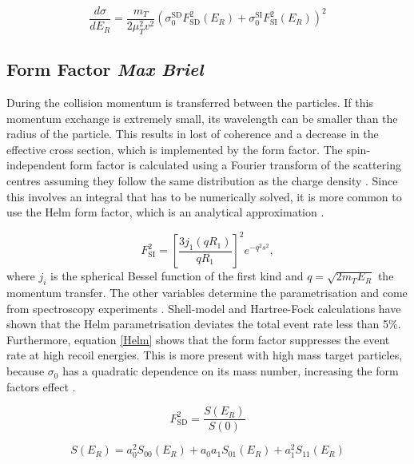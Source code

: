 \documentclass{article}
\begin{document}
\begin{equation} \label{Eff_cross}
    \frac{d\sigma}{dE_R} = \frac{m_T}{2\mu_T^2 v^2} \left( \sigma_0^\text{SD} F^2_\text{SD}(E_R) + \sigma_0^\text{SI} F^2_\text{SI}(E_R)\right)^2
\end{equation}

\subsection{Form Factor \small{\textit{Max Briel}}} 

During the collision momentum is transferred between the particles. If this momentum exchange is extremely small, its wavelength can be smaller than the radius of the particle. This results in lost of coherence and a decrease in the effective cross section, which is implemented by the form factor. 
The spin-independent form factor is calculated using a Fourier transform of the scattering centres assuming they follow the same distribution as the charge density \cite{Lewin:1995rx}. Since this involves an integral that has to be numerically solved, it is more common to use the Helm form factor, which is an analytical approximation \cite{Helm:1956zz}.

\begin{equation} \label{Helm}
    F^2_\text{SI} = \left[ \frac{3 j_1(qR_1)}{qR_1} \right]^2 e^{-q^2 s^2}, 
\end{equation}
where $j_i$ is the spherical Bessel function of the first kind and $q = \sqrt{2m_T E_R}$ the momentum transfer. The other variables determine the parametrisation and come from spectroscopy experiments \cite{Fricke:1995zz}. Shell-model \cite{Vietze:2014vsa} and Hartree-Fock calculations \cite{Co:2012adt, Duda:2006uk} have shown that the Helm parametrisation deviates the total event rate less than 5\%. Furthermore, equation \ref{Helm} shows that the form factor suppresses the event rate at high recoil energies. This is more present with high mass target particles, because $\sigma_0$ has a quadratic dependence on its mass number, increasing the form factors effect \cite{Undagoitia:2015gya}.

\begin{equation} \label{SD_Form}
    F^2_\text{SD} = \frac{S(E_R)}{S(0)}
\end{equation}

\begin{equation} \label{Response}
    S(E_R) = a^2_0 S_{00}(E_R) + a_0a_1S_{01}(E_R) + a_1^2 S_{11}(E_R)
\end{equation}
\end{document}
